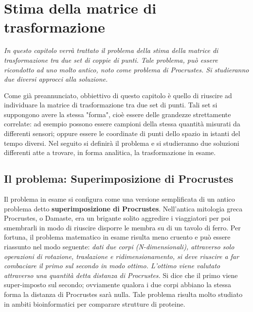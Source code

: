 \chapter{Stima della matrice di trasformazione}
\label{chap:stima}

\begin{minipage}{12cm}\textit{In questo capitolo verrà trattato il problema della stima della matrice di trasformazione tra due set di coppie di punti. Tale problema, può essere ricondotto ad uno molto antico, noto come problema di Procrustes. Si studieranno due diversi approcci alla soluzione.}
\end{minipage}

\vspace*{1cm}

Come già preannunciato, obbiettivo di questo capitolo è quello di riuscire ad individuare la matrice di trasformazione tra due set di punti. Tali set si suppongono avere la stessa "forma", cioè essere delle grandezze strettamente correlate: ad esempio possono essere campioni della stessa quantità misurati da differenti sensori; oppure essere le coordinate di punti dello spazio in istanti del tempo diversi. Nel seguito si definirà il problema e si studieranno due soluzioni differenti atte a trovare, in forma analitica, la trasformazione in esame.  

\section{Il problema: Superimposizione di Procrustes}
\label{sec:problStima}
Il problema in esame si configura come una versione semplificata di un antico problema detto \textbf{superimposizione di Procrustes}. Nell'antica mitologia greca Procrustes, o Damaste, era un brigante solito aggredire i viaggiatori per poi smembrarli in modo di riuscire disporre le membra su di un tavolo di ferro. 
Per fortuna, il problema matematico in esame risulta meno cruento e può essere riassunto nel modo seguente: \textit{dati due corpi (N-dimensionali), attraverso solo operazioni di rotazione, traslazione e ridimensionamento, si deve riuscire a far combaciare il primo sul secondo in modo ottimo. L'ottimo viene valutato attraverso una quantità detta distanza di Procrustes.} Si dice che il primo viene super-imposto sul secondo; ovviamente qualora i due corpi abbiano la stessa forma la distanza di Procrustes sarà nulla. 
Tale problema risulta molto studiato in ambiti bioinformatici per comparare strutture di proteine. 

